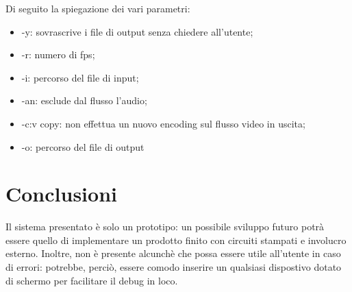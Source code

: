 \documentclass[12pt]{article}
\begin{document}
	Di seguito la spiegazione dei vari parametri:
	\begin{itemize}
		\item -y: sovrascrive i file di output senza chiedere all'utente;
		\item -r: numero di fps;
		\item -i: percorso del file di input;
		\item -an: esclude dal flusso l'audio;
		\item -c:v copy: non effettua un nuovo encoding sul flusso video in uscita;
		\item -o: percorso del file di output
	\end{itemize}

	\section{Conclusioni}
	Il sistema presentato è solo un prototipo: un possibile sviluppo futuro potrà essere quello di 
	implementare un prodotto finito con circuiti stampati e involucro esterno. Inoltre, non è 
	presente alcunchè che possa essere utile all'utente in caso di errori: potrebbe, perciò, essere
	comodo inserire un qualsiasi dispostivo dotato di schermo per facilitare il debug in loco.
\end{document}
